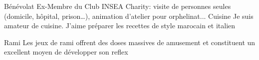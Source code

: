 



\begin{cvskills}

  \cvskill
    {Bénévolat} %
    {Ex-Membre du Club INSEA Charity: visite de personnes seules (domicile, hôpital,
prison…), animation d’atelier pour orphelinat...}
  \cvskill
    {Cuisine} %
    {Je suis amateur de cuisine. J'aime préparer les recettes de style marocain et italien} %

  \cvskill
    {Rami} %
    {Les jeux de rami offrent des doses massives de amusement et constituent un excellent moyen de développer son reflex } %

\end{cvskills}
